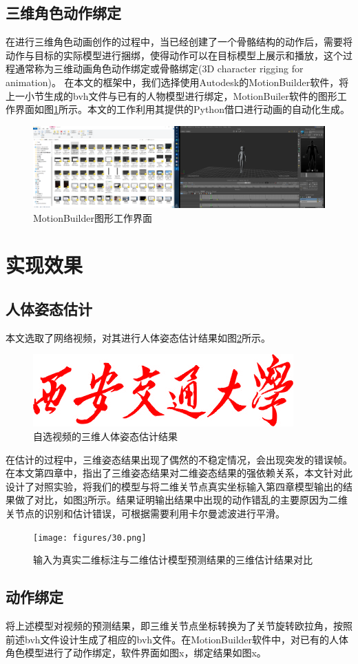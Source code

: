 \subsection{三维角色动作绑定}{}
在进行三维角色动画创作的过程中，当已经创建了一个骨骼结构的动作后，需要将动作与目标的实际模型进行捆绑，使得动作可以在目标模型上展示和播放，这个过程通常称为三维动画角色动作绑定或骨骼绑定(3D character rigging for animation)。
在本文的框架中，我们选择使用Autodesk的MotionBuilder软件，将上一小节生成的bvh文件与已有的人物模型进行绑定，MotionBuiler软件的图形工作界面如图\ref{fig:f28}所示。本文的工作利用其提供的Python借口进行动画的自动化生成。
\begin{figure}[h]
	\centering
	\includegraphics[scale=0.4]{figures/28.png}
	\caption{MotionBuilder图形工作界面}
	\label{fig:f28}
\end{figure}


\section{实现效果}
\subsection{人体姿态估计}{}
本文选取了网络视频，对其进行人体姿态估计结果如图\ref{fig:f29}所示。
\begin{figure}[h]
	\centering
	\includegraphics[scale=0.4]{figures/XJTU_RED.png}
	\caption{自选视频的三维人体姿态估计结果}
	\label{fig:f29}
\end{figure}
在估计的过程中，三维姿态结果出现了偶然的不稳定情况，会出现突发的错误帧。在本文第四章中，指出了三维姿态结果对二维姿态结果的强依赖关系，本文针对此设计了对照实验，将我们的模型与将二维关节点真实坐标输入第四章模型输出的结果做了对比，如图\ref{fig:f30}所示。结果证明输出结果中出现的动作错乱的主要原因为二维关节点的识别和估计错误，可根据需要利用卡尔曼滤波进行平滑。
\begin{figure}[h]
	\centering
	\texttt{[image: figures/30.png]}
	\caption{输入为真实二维标注与二维估计模型预测结果的三维估计结果对比}
	\label{fig:f30}
\end{figure}

\subsection{动作绑定}{}
将上述模型对视频的预测结果，即三维关节点坐标转换为了关节旋转欧拉角，按照前述bvh文件设计生成了相应的bvh文件。在MotionBuilder软件中，对已有的人体角色模型进行了动作绑定，软件界面如图x，绑定结果如图x。